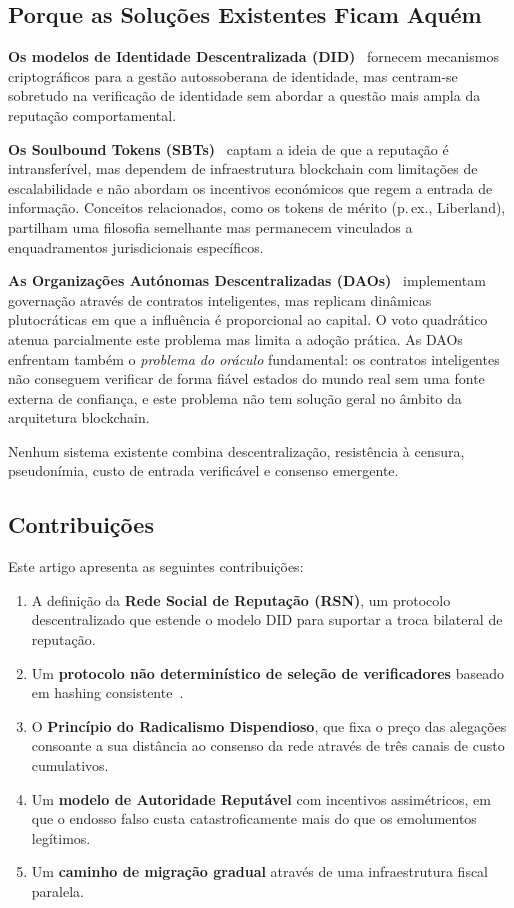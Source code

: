 \documentclass[11pt,a4paper,twocolumn]{article}
\begin{document}
\subsection{Porque as Soluções Existentes Ficam Aquém}

\textbf{Os modelos de Identidade Descentralizada (DID)}~\cite{did2022} fornecem mecanismos criptográficos para a gestão autossoberana de identidade, mas centram-se sobretudo na verificação de identidade sem abordar a questão mais ampla da reputação comportamental.

\textbf{Os Soulbound Tokens (SBTs)}~\cite{weyl2022} captam a ideia de que a reputação é intransferível, mas dependem de infraestrutura blockchain com limitações de escalabilidade e não abordam os incentivos económicos que regem a entrada de informação. Conceitos relacionados, como os tokens de mérito (p.\,ex., Liberland), partilham uma filosofia semelhante mas permanecem vinculados a enquadramentos jurisdicionais específicos.

\textbf{As Organizações Autónomas Descentralizadas (DAOs)}~\cite{buterin2014} implementam governação através de contratos inteligentes, mas replicam dinâmicas plutocráticas em que a influência é proporcional ao capital. O voto quadrático~\cite{buterin2019} atenua parcialmente este problema mas limita a adoção prática. As DAOs enfrentam também o \emph{problema do oráculo} fundamental: os contratos inteligentes não conseguem verificar de forma fiável estados do mundo real sem uma fonte externa de confiança, e este problema não tem solução geral no âmbito da arquitetura blockchain.

Nenhum sistema existente combina descentralização, resistência à censura, pseudonímia, custo de entrada verificável e consenso emergente.

\subsection{Contribuições}

Este artigo apresenta as seguintes contribuições:
\begin{enumerate}[nosep]
\item A definição da \textbf{Rede Social de Reputação (RSN)}, um protocolo descentralizado que estende o modelo DID para suportar a troca bilateral de reputação.
\item Um \textbf{protocolo não determinístico de seleção de verificadores} baseado em hashing consistente~\cite{karger1997}.
\item O \textbf{Princípio do Radicalismo Dispendioso}, que fixa o preço das alegações consoante a sua distância ao consenso da rede através de três canais de custo cumulativos.
\item Um \textbf{modelo de Autoridade Reputável} com incentivos assimétricos, em que o endosso falso custa catastroficamente mais do que os emolumentos legítimos.
\item Um \textbf{caminho de migração gradual} através de uma infraestrutura fiscal paralela.
\end{enumerate}
\end{document}
